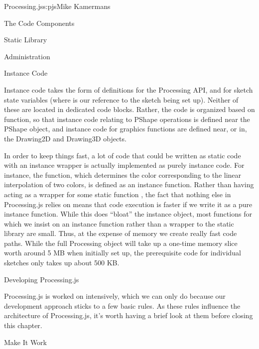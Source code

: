 \begin{aosachapter}{Processing.js}{s:pjs}{Mike Kamermans}
\begin{aosasect1}{The Code Components}
\begin{aosasect2}{Static Library}
\begin{aosasect3}{Administration}
\end{aosasect3}
\end{aosasect2}

\begin{aosasect2}{Instance Code}

Instance code takes the form of 
definitions for the Processing API, and  for sketch
state variables (where  is our reference to the sketch being set
up). Neither of these are located in dedicated code blocks. Rather,
the code is organized based on function, so that instance code
relating to PShape operations is defined near the PShape object, and
instance code for graphics functions are defined near, or in, the
Drawing2D and Drawing3D objects.

In order to keep things fast, a lot of code that could be written as
static code with an instance wrapper is actually implemented as purely
instance code. For instance, the  function,
which determines the color corresponding to the linear interpolation
of two colors, is defined as an instance function. Rather than having
 acting as a wrapper for some static function
, the fact that nothing else in
Processing.js relies on  means that code execution is
faster if we write it as a pure instance function. While this does
``bloat'' the instance object, most functions for which we insist on an
instance function rather than a wrapper to the static library are
small. Thus, at the expense of memory we create really fast code
paths. While the full Processing object will take up a one-time memory
slice worth around 5 MB when initially set up, the prerequisite code
for individual sketches only takes up about 500 KB.

\end{aosasect2}

\end{aosasect1}

\begin{aosasect1}{Developing Processing.js}

Processing.js is worked on intensively, which we can only do because
our development approach sticks to a few basic rules. As these rules
influence the architecture of Processing.js, it's worth having a brief
look at them before closing this chapter.

\begin{aosasect2}{Make It Work}


\end{aosasect2}
\end{aosasect1}
\end{aosachapter}
